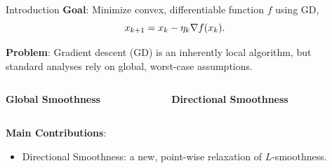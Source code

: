 \documentclass[12pt, usenames, dvipsnames]{beamer}
\newlength{\sepwidth}
\newlength{\colwidth}
\newcommand{\separatorcolumn}{\begin{column}{\sepwidth}\end{column}}
\newcommand{\bad}[1]{\textcolor{bad}{#1}}
\newcommand{\good}[1]{\textcolor{CBBlue}{#1}}
\begin{document}
\begin{frame}[t]
    \large
    \vspace{-2.5ex}
    \begin{columns}[t]
        \separatorcolumn
        \begin{column}{\colwidth}
            \begin{block}{Introduction}
                {\Large
                    \textbf{Goal}: Minimize convex, differentiable function \( f \) using
                    GD,
                    \[
                        x_{k+1} = x_k - \eta_k \nabla f(x_k).
                    \]
                }

                {\Large
                    \textbf{Problem}: Gradient descent (GD) is an inherently \good{local algorithm},
                    but standard analyses rely on \bad{global, worst-case} assumptions.%
                }
                \vspace{-1.5ex}
                \begin{columns}[t]
                    \begin{column}{0.5\textwidth}
                        \begin{center}
                            \Large \textbf{\bad{Global Smoothness}}
                        \end{center}
                        \vspace{-2ex}

                        \begin{figure}[]
                            \centering
                            
                        \end{figure}
                    \end{column}
                    \begin{column}{0.5\textwidth}
                        \begin{center}
                            \Large \textbf{\good{Directional Smoothness}}
                        \end{center}
                        \vspace{-2ex}

                        \begin{figure}[]
                            \centering
                            
                        \end{figure}
                    \end{column}
                \end{columns}
                {\Large \textbf{Main Contributions}:}
                \vspace{-1.5ex}
                \begin{itemize}
                    \item \good{Directional Smoothness}:
                          a new, point-wise relaxation of \( L \)-smoothness.


\end{itemize}
\end{block}
\end{column}
\end{columns}
\end{frame}
\end{document}
